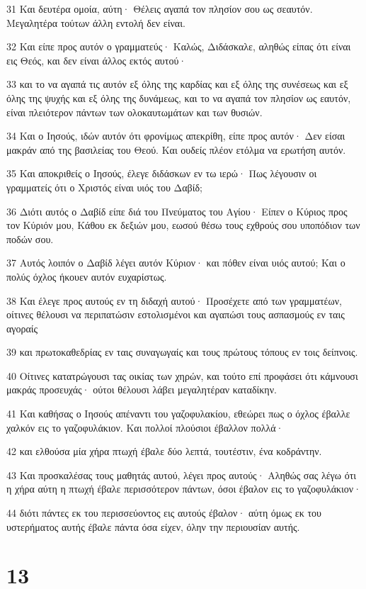 \par 31 Και δευτέρα ομοία, αύτη· Θέλεις αγαπά τον πλησίον σου ως σεαυτόν. Μεγαλητέρα τούτων άλλη εντολή δεν είναι.
\par 32 Και είπε προς αυτόν ο γραμματεύς· Καλώς, Διδάσκαλε, αληθώς είπας ότι είναι εις Θεός, και δεν είναι άλλος εκτός αυτού·
\par 33 και το να αγαπά τις αυτόν εξ όλης της καρδίας και εξ όλης της συνέσεως και εξ όλης της ψυχής και εξ όλης της δυνάμεως, και το να αγαπά τον πλησίον ως εαυτόν, είναι πλειότερον πάντων των ολοκαυτωμάτων και των θυσιών.
\par 34 Και ο Ιησούς, ιδών αυτόν ότι φρονίμως απεκρίθη, είπε προς αυτόν· Δεν είσαι μακράν από της βασιλείας του Θεού. Και ουδείς πλέον ετόλμα να ερωτήση αυτόν.
\par 35 Και αποκριθείς ο Ιησούς, έλεγε διδάσκων εν τω ιερώ· Πως λέγουσιν οι γραμματείς ότι ο Χριστός είναι υιός του Δαβίδ;
\par 36 Διότι αυτός ο Δαβίδ είπε διά του Πνεύματος του Αγίου· Είπεν ο Κύριος προς τον Κύριόν μου, Κάθου εκ δεξιών μου, εωσού θέσω τους εχθρούς σου υποπόδιον των ποδών σου.
\par 37 Αυτός λοιπόν ο Δαβίδ λέγει αυτόν Κύριον· και πόθεν είναι υιός αυτού; Και ο πολύς όχλος ήκουεν αυτόν ευχαρίστως.
\par 38 Και έλεγε προς αυτούς εν τη διδαχή αυτού· Προσέχετε από των γραμματέων, οίτινες θέλουσι να περιπατώσιν εστολισμένοι και αγαπώσι τους ασπασμούς εν ταις αγοραίς
\par 39 και πρωτοκαθεδρίας εν ταις συναγωγαίς και τους πρώτους τόπους εν τοις δείπνοις.
\par 40 Οίτινες κατατρώγουσι τας οικίας των χηρών, και τούτο επί προφάσει ότι κάμνουσι μακράς προσευχάς· ούτοι θέλουσι λάβει μεγαλητέραν καταδίκην.
\par 41 Και καθήσας ο Ιησούς απέναντι του γαζοφυλακίου, εθεώρει πως ο όχλος έβαλλε χαλκόν εις το γαζοφυλάκιον. Και πολλοί πλούσιοι έβαλλον πολλά·
\par 42 και ελθούσα μία χήρα πτωχή έβαλε δύο λεπτά, τουτέστιν, ένα κοδράντην.
\par 43 Και προσκαλέσας τους μαθητάς αυτού, λέγει προς αυτούς· Αληθώς σας λέγω ότι η χήρα αύτη η πτωχή έβαλε περισσότερον πάντων, όσοι έβαλον εις το γαζοφυλάκιον·
\par 44 διότι πάντες εκ του περισσεύοντος εις αυτούς έβαλον· αύτη όμως εκ του υστερήματος αυτής έβαλε πάντα όσα είχεν, όλην την περιουσίαν αυτής.

\chapter{13}

